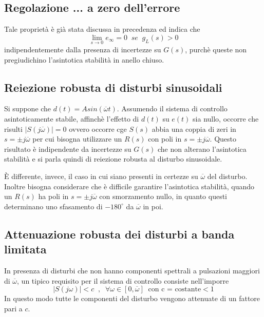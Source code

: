 \documentclass[a4paper]{report}
\begin{document}
\subsection{Regolazione ... a zero dell'errore}
Tale propriet\`a \`e gi\`a stata discussa in precedenza ed indica che
\[
\lim_{s \to 0} e_{\infty} = 0 \;\; se \;\; g_L(s) > 0
\]
indipendentemente dalla presenza di incertezze su $G(s)$, purch\`e
queste non pregiudichino l'asintotica stabilit\`a in anello chiuso.
\subsection{Reiezione robusta di disturbi sinusoidali}
Si suppone che $d(t) = A sin(\overline{\omega}t)$. Assumendo il sistema
di controllo asintoticamente stabile, affinch\`e l'effetto di $d(t)$
su $e(t)$ sia nullo, occorre che risulti $|S(j \overline{\omega})| =
0$ ovvero occorre cge $S(s)$ abbia una coppia di zeri in $s = \pm j
\overline{\omega}$ per cui bisogna utilizzare un $R(s)$ con poli in $s
= \pm j \overline{\omega}$. Questo risultato \`e indipendente  da
incertezze su $G(s)$ che non alterano l'asintotica stabilit\`a e si
parla quindi di reiezione robusta al disturbo sinusoidale.

\`E differente, invece, il caso in cui siano presenti in certezze su
$\overline{\omega}$ del disturbo. Inoltre bisogna considerare che \`e
difficile garantire l'asintotica stabilit\`a, quando un $R(s)$ ha poli
in $s = \pm j \overline{\omega}$ con smorzamento nullo, in quanto
questi determinano uno sfasamento di $- 180^{\circ}$ da
$\overline{\omega}$ in poi.
\subsection{Attenuazione robusta dei disturbi a banda limitata}
In presenza di disturbi che non hanno componenti spettrali a
pulsazioni maggiori di $\overline{\omega}$, un tipico requisito per il
sistema di controllo consiste nell'imporre
\[
|S(j \omega)| < c \;\;,\;\; \forall \omega \in [0, \overline{\omega}]
\;\;\textrm{con c = costante} < 1
\]
In questo modo tutte le componenti del disturbo vengono attenuate di
un fattore pari a $c$.
\end{document}
